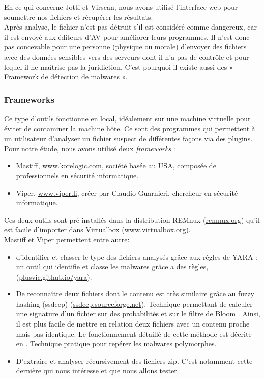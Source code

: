 \documentclass[smallextended]{svjour3}       %
\begin{document}
$ $\\
En ce qui concerne Jotti et Virscan, nous avons utilisé l'interface web pour soumettre nos fichiers et récupérer les résultats.\\
$ $\\
Après analyse, le fichier n'est pas détruit s'il est considéré comme dangereux, car il est envoyé aux éditeurs d'AV pour améliorer leurs programmes. Il n'est donc pas concevable pour une personne (physique ou morale) d'envoyer des fichiers avec des données sensibles vers des serveurs dont il n'a pas de contrôle et pour lequel il ne maîtrise pas la juridiction. C'est pourquoi il existe aussi des « Framework de détection de malwares ».\\

\subsubsection{Frameworks}
Ce type d'outils fonctionne en local, idéalement sur une machine virtuelle pour éviter de contaminer la machine hôte. Ce sont des programmes qui permettent à un utilisateur d'analyser un fichier suspect de différentes façons via des plugins. Pour notre étude, nous avons utilisé deux \textit{frameworks} : 
\label{2.2.2frameworks}
\begin{itemize}
\item Mastiff, \url{www.korelogic.com}, société basée au USA, composée de professionnels en sécurité informatique.
\item Viper, \url{www.viper.li}, créer par Claudio Guarnieri, chercheur en sécurité informatique.
\end{itemize}
Ces deux outils sont pré-installés dans la distribution REMnux (\url{remnux.org}) qu'il est facile d'importer dans Virtualbox (\url{www.virtualbox.org}).\\
Mastiff et Viper permettent entre autre:
\begin{itemize}
\item d’identifier et classer le type des fichiers analysés grâce aux règles de YARA : un outil qui identifie et classe les malwares grâce a des règles, (\url{plusvic.github.io/yara}).
\item De reconnaître deux fichiers dont le contenu est très similaire grâce au fuzzy hashing (ssdeep) (\url{ssdeep.sourceforge.net}). Technique permettant de calculer une signature d'un fichier sur des probabilités et sur le filtre de Bloom \cite{Bloom}. Ainsi, il est plus facile de mettre en relation deux fichiers avec un contenu proche mais pas identique. Le fonctionnement détaillé de cette méthode est décrite en \cite{Tournier}. Technique pratique pour repérer les malwares polymorphes.
\item D'extraire et analyser récursivement des fichiers zip. C'est notamment cette dernière qui nous intéresse et que nous allons tester.
\end{itemize}
\end{document}

